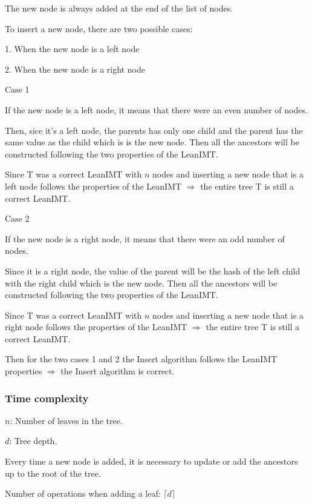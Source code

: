 \documentclass{article}
\begin{document}
The new node is always added at the end of the list of nodes.

To insert a new node, there are two possible cases:

1. When the new node is a left node

2. When the new node is a right node

Case 1

If the new node is a left node, it means that there were an even number of nodes.

Then, sice it's a left node, the parents has only one child and the parent has the same value as the child which is is the new node. Then all the ancestors will be constructed following the two properties of the LeanIMT.

Since T was a correct LeanIMT with $n$ nodes and inserting a new node that is a left node follows the properties of the LeanIMT $\Rightarrow$ the entire tree T is still a correct LeanIMT.

Case 2

If the new node is a right node, it means that there were an odd number of nodes.

Since it is a right node, the value of the parent will be the hash of the left child with the right child which is the new node. Then all the ancestors will be constructed following the two properties of the LeanIMT.

Since T was a correct LeanIMT with $n$ nodes and inserting a new node that is a right node follows the properties of the LeanIMT $\Rightarrow$ the entire tree T is still a correct LeanIMT.

Then for the two cases 1 and 2 the Insert algorithm follows the LeanIMT properties $\Rightarrow$ the Insert algorithm is correct.



\subsubsection{Time complexity}



$n$: Number of leaves in the tree.

$d$: Tree depth.



Every time a new node is added, it is necessary to update or add the ancestors up to the root of the tree.


\label{InsertProof}
Number of operations when adding a leaf: $\lceil d \rceil$
\end{document}
